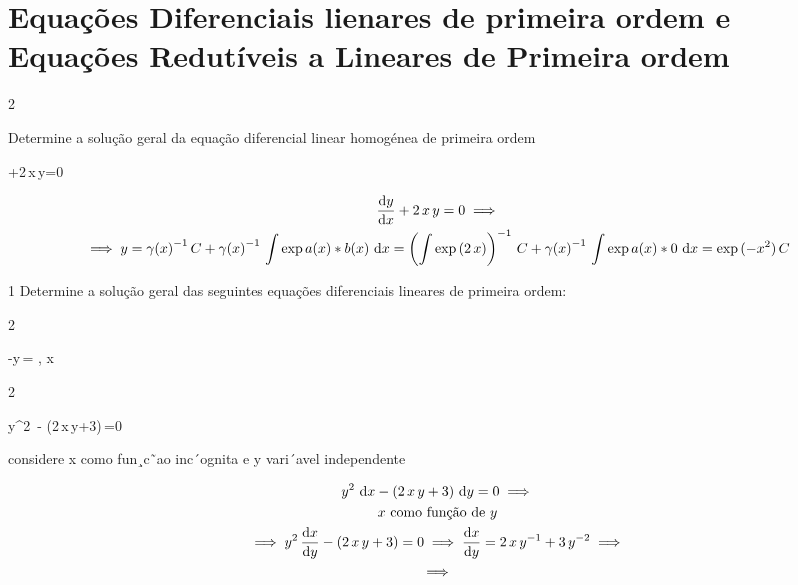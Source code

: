\documentclass["./AM3C.exercises_resolutions.2024.tex"]{subfiles}
\begin{document}
\part*{Equações Diferenciais lienares de primeira ordem e Equações Redutíveis a Lineares de Primeira ordem}

\setcounter{question}{5}
\begin{questionBox}2{} %

  Determine a solução geral da equação diferencial linear homogénea de primeira ordem
  \begin{BM}
    +2\,x\,y=0
  \end{BM}

  \answer{}

  \begin{gather*}
    \odv{y}{x}+2\,x\,y=0
    \implies \\
    \implies
    y
    = \gamma{(x)}^{-1}
    \,C
    + \gamma{(x)}^{-1}
    \,\int{\exp{a(x)}*b(x)\,\odif{x}}
    = \left(
      \int{\exp{(2\,x)}}
    \right)^{-1}
    \,C
    + \gamma{(x)}^{-1}
    \,\int{\exp{a(x)}*0\,\odif{x}}
    = \exp{(-x^2)}
    \,C
  \end{gather*}
\end{questionBox}

\begin{questionBox}1{} %
  Determine a solução geral das seguintes equações diferenciais lineares de primeira ordem:
\end{questionBox}

\begin{questionBox}2{} %

  \begin{BM}
    -y\,=
    , \quad
    x\in{}
  \end{BM}

\end{questionBox}

\begin{questionBox}2{} %
  \begin{BM}
    y^2\,
    - (2\,x\,y+3)\,=0
  \end{BM}
  considere x como fun¸c˜ao inc´ognita e y vari´avel independente

  \answer{}

  \begin{gather*}
    y^2\,\odif{x}
    - (2\,x\,y+3)\,\odif{y}=0
    \implies \\
    x \text{ como função de } y
    \\
    \implies
    y^2\,\odv{x}{y}
    - (2\,x\,y+3)=0
    \implies
    \odv{x}{y}
    =
    2\,x\,y^{-1}
    + 3\,y^{-2}
    \implies \\
    \implies
  \end{gather*}

\end{questionBox}
\end{document}
